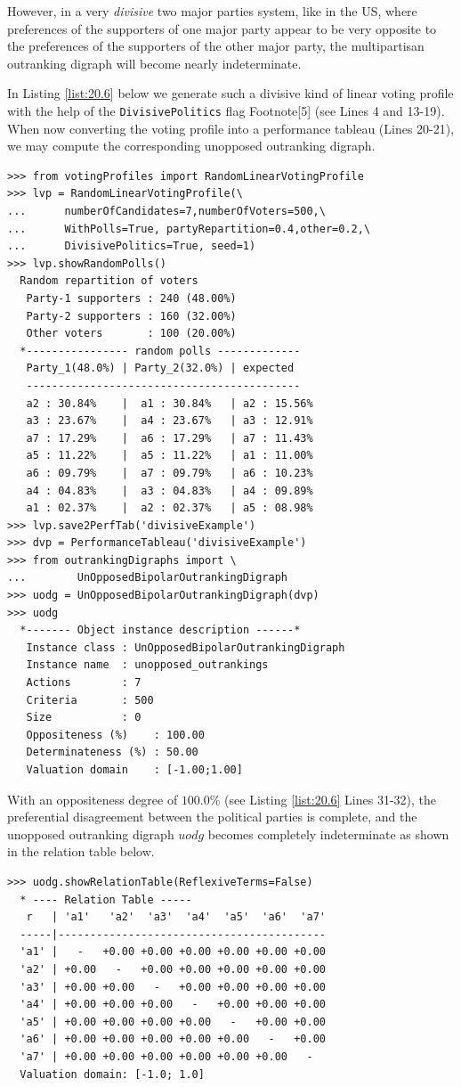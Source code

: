 However, in a very \emph{divisive} two major parties system, like in the US, where preferences of the supporters of one major party appear to be very opposite to the preferences of the supporters of the other major party, the multipartisan outranking digraph will become nearly indeterminate.

In Listing \ref{list:20.6} below we generate such a divisive kind of linear voting profile with the help of the \texttt{DivisivePolitics} flag  Footnote[5] (see Lines 4 and 13-19). When now converting the voting profile into a performance tableau (Lines 20-21), we may compute the corresponding unopposed outranking digraph.
\begin{lstlisting}[caption={A divisive two-party example of a random linear voting profile},label=list:20.6]
>>> from votingProfiles import RandomLinearVotingProfile		     
>>> lvp = RandomLinearVotingProfile(\
...      numberOfCandidates=7,numberOfVoters=500,\
...      WithPolls=True, partyRepartition=0.4,other=0.2,\
...      DivisivePolitics=True, seed=1)
>>> lvp.showRandomPolls()
  Random repartition of voters
   Party-1 supporters : 240 (48.00%)
   Party-2 supporters : 160 (32.00%)
   Other voters       : 100 (20.00%)
  *---------------- random polls -------------
   Party_1(48.0%) | Party_2(32.0%) | expected  
   -------------------------------------------
   a2 : 30.84%    |  a1 : 30.84%   | a2 : 15.56%
   a3 : 23.67%    |  a4 : 23.67%   | a3 : 12.91%
   a7 : 17.29%    |  a6 : 17.29%   | a7 : 11.43%
   a5 : 11.22%    |  a5 : 11.22%   | a1 : 11.00%
   a6 : 09.79%    |  a7 : 09.79%   | a6 : 10.23%
   a4 : 04.83%    |  a3 : 04.83%   | a4 : 09.89%
   a1 : 02.37%    |  a2 : 02.37%   | a5 : 08.98%
>>> lvp.save2PerfTab('divisiveExample')
>>> dvp = PerformanceTableau('divisiveExample')
>>> from outrankingDigraphs import \
...        UnOpposedBipolarOutrankingDigraph
>>> uodg = UnOpposedBipolarOutrankingDigraph(dvp)
>>> uodg
  *------- Object instance description ------*
   Instance class : UnOpposedBipolarOutrankingDigraph
   Instance name  : unopposed_outrankings
   Actions        : 7
   Criteria       : 500
   Size           : 0
   Oppositeness (%)    : 100.00
   Determinateness (%) : 50.00
   Valuation domain    : [-1.00;1.00]
\end{lstlisting}
With an oppositeness degree of $100.0\%$ (see Listing \ref{list:20.6} Lines 31-32), the preferential disagreement between the political parties is complete, and the unopposed outranking digraph $uodg$ becomes completely indeterminate as shown in the relation table below.
\begin{lstlisting}
>>> uodg.showRelationTable(ReflexiveTerms=False)
  * ---- Relation Table -----
   r   | 'a1'   'a2'  'a3'  'a4'  'a5'  'a6'  'a7'   
  -----|------------------------------------------
  'a1' |   -   +0.00 +0.00 +0.00 +0.00 +0.00 +0.00  
  'a2' | +0.00   -   +0.00 +0.00 +0.00 +0.00 +0.00  
  'a3' | +0.00 +0.00   -   +0.00 +0.00 +0.00 +0.00  
  'a4' | +0.00 +0.00 +0.00   -   +0.00 +0.00 +0.00  
  'a5' | +0.00 +0.00 +0.00 +0.00   -   +0.00 +0.00  
  'a6' | +0.00 +0.00 +0.00 +0.00 +0.00   -   +0.00  
  'a7' | +0.00 +0.00 +0.00 +0.00 +0.00 +0.00   -   
  Valuation domain: [-1.0; 1.0]
\end{lstlisting}      

